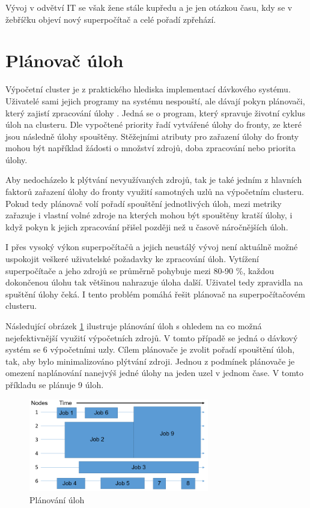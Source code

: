 Vývoj v odvětví IT se však žene stále kupředu a je jen otázkou času, kdy se v žebříčku objeví nový superpočítač a celé pořadí zpřehází.

\section{Plánovač úloh}
Výpočetní cluster je z praktického hlediska implementací dávkového systému. Uživatelé sami jejich programy na systému nespouští, ale dávají pokyn plánovači, který zajistí zpracování úlohy \cite{W94NKRaxvG2L2A1W}. Jedná se o program, který spravuje životní cyklus úloh na clusteru. Dle vypočtené priority řadí vytvářené úlohy do fronty, ze které jsou následně úlohy spouštěny. Stěžejními atributy pro zařazení úlohy do fronty mohou být například žádosti o množství zdrojů, doba zpracování nebo priorita úlohy.

Aby nedocházelo k plýtvání nevyužívaných zdrojů, tak je také jedním z hlavních faktorů zařazení úlohy do fronty využití samotných uzlů na výpočetním clusteru. Pokud tedy plánovač volí pořadí spouštění jednotlivých úloh, mezi metriky zařazuje i vlastní volné zdroje na kterých mohou být spouštěny kratší úlohy, i když pokyn k jejich zpracování přišel později než u časově náročnějších úloh.

I přes vysoký výkon superpočítačů a jejich neustálý vývoj není aktuálně možné uspokojit veškeré uživatelské požadavky ke zpracování úloh. Vytížení superpočítače a jeho zdrojů se průměrně pohybuje mezi 80-90 \%, každou dokončenou úlohu tak většinou nahrazuje úloha další. Uživatel tedy zpravidla na spuštění úlohy čeká. I tento problém pomáhá řešit plánovač na superpočítačovém clusteru. 

Následující obrázek \ref{fig:planovani-uloh} ilustruje plánování úloh s ohledem na co možná nejefektivnější využití výpočetních zdrojů. V tomto případě se jedná o dávkový systém se 6 výpočetními uzly. Cílem plánovače je zvolit pořadí spouštění úloh, tak, aby bylo minimalizováno plýtvání zdroji. Jednou z podmínek plánovače je omezení naplánování nanejvýš jedné úlohy na jeden uzel v jednom čase. V tomto příkladu se plánuje 9 úloh.

\begin{figure}[h]
	\centering
	\includegraphics[width=0.7\textwidth]{Figures/Scheduler.png}
	\caption{Plánování úloh \cite{W94NKRaxvG2L2A1W}}
	\label{fig:planovani-uloh}
\end{figure}

